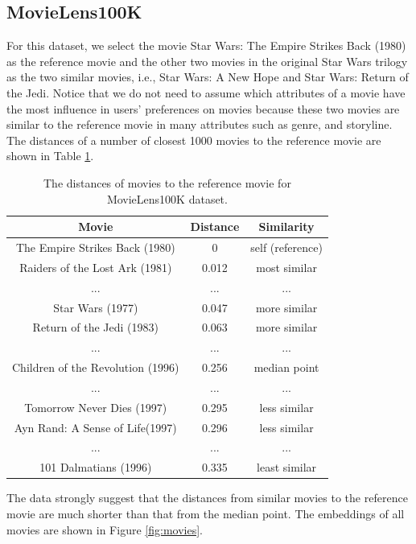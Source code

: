 \documentclass[conference]{IEEEtran}
\begin{document}
\subsection{MovieLens100K}
For this dataset, we select the movie Star Wars: The Empire Strikes Back (1980) as the reference movie and the other two movies in the original Star Wars trilogy as the two similar movies, i.e., Star Wars: A New Hope and Star Wars: Return of the Jedi.
Notice that we do not need to assume which attributes of a movie have the most influence in users' preferences on movies because these two movies are similar to the reference movie in many attributes such as genre, and storyline.
The distances of a number of closest 1000 movies to the reference movie are shown in Table \ref{tab:movielens100k-distance}.
\begin{table}[!ht]
	\centering
	\caption{
		The distances of movies to the reference movie for MovieLens100K dataset.
	}
	\begin{tabular}{ccc} \hline \rowcolor{blue!30}
		Movie & Distance & Similarity \\ \hline
		The Empire Strikes Back (1980) & 0 & self (reference) \\ \hline
		Raiders of the Lost Ark (1981) & 0.012 & most similar \\ \hline
		... & ... & ... \\ \hline
		Star Wars (1977) & 0.047 & more similar \\ \hline
		Return of the Jedi (1983) & 0.063 & more similar \\ \hline
		... & ... & ... \\ \hline
		Children of the Revolution (1996) & 0.256 & median point \\ \hline
		... & ... & ... \\ \hline
		Tomorrow Never Dies (1997) & 0.295 & less similar \\ \hline
		Ayn Rand: A Sense of Life(1997) & 0.296 & less similar \\ \hline
		... & ... & ... \\ \hline
		101 Dalmatians (1996) & 0.335 & least similar \\ \hline
	\end{tabular}
	\label{tab:movielens100k-distance}
\end{table}
The data strongly suggest that the distances from similar movies to the reference movie are much shorter than that from the median point.
The embeddings of all movies are shown in Figure \ref{fig:movies}.
\end{document}
